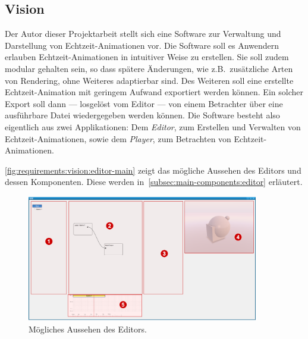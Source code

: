 
\subsection{Vision}
\label{subsec:requirements:vision}

Der Autor dieser Projektarbeit stellt sich eine Software zur Verwaltung und
Darstellung von Echtzeit-Animationen vor. Die Software soll es Anwendern
erlauben Echtzeit-Animationen in intuitiver Weise zu erstellen. Sie soll zudem
modular gehalten sein, so dass spätere Änderungen, wie z.B.\ zusätzliche Arten
von Rendering, ohne Weiteres adaptierbar sind. Des Weiteren soll eine erstellte
Echtzeit-Animation mit geringem Aufwand exportiert werden können. Ein solcher
Export soll dann --- losgelöst vom Editor --- von einem Betrachter über eine
ausführbare Datei wiedergegeben werden können. Die Software besteht also
eigentlich aus zwei Applikationen: Dem \textit{Editor}, zum Erstellen und
Verwalten von Echtzeit-Animationen, sowie dem \textit{Player}, zum Betrachten
von Echtzeit-Animationen.

\autoref{fig:requirements:vision:editor-main} zeigt das mögliche Aussehen des
Editors und dessen Komponenten. Diese werden
in~\autoref{subsec:main-components:editor} erläutert.

\begin{figure}[H]
    \centering
    \includegraphics[width=0.9\textwidth]{img/editor_components.png}
    \caption{Mögliches Aussehen des Editors.}\label{fig:requirements:vision:editor-main}
\end{figure}
